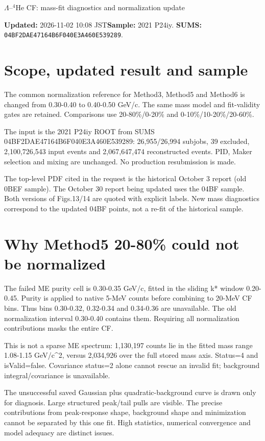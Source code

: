 \documentclass[10pt,a4paper]{article}
\begin{document}
\begin{center}{\Large $\Lambda$--$^{4}$He CF: mass-fit diagnostics and normalization update}\end{center}
\textbf{Updated:} 2026-11-02 10:08 JST\quad\textbf{Sample:} 2021 P24iy.
\textbf{SUMS:} \texttt{04BF2DAE47164B6F040E3A460E539289}.
\section*{Scope, updated result and sample}
The common normalization reference for Method3, Method5 and Method6 is changed from 0.30-0.40 to 0.40-0.50 GeV/c. The same mass model and fit-validity gates are retained. Comparisons use 20-80\%/0-20\% and 0-10\%/10-20\%/20-60\%.

The input is the 2021 P24iy ROOT from SUMS 04BF2DAE47164B6F040E3A460E539289: 26,955/26,994 subjobs, 39 excluded, 2,100,726,543 input events and 2,067,647,474 reconstructed events. PID, Maker selection and mixing are unchanged. No production resubmission is made.

The top-level PDF cited in the request is the historical October 3 report (old 0BEF sample). The October 30 report being updated uses the 04BF sample. Both versions of Figs.13/14 are quoted with explicit labels. New mass diagnostics correspond to the updated 04BF points, not a re-fit of the historical sample.

\clearpage
\section*{Why Method5 20-80\% could not be normalized}
The failed ME purity cell is 0.30-0.35 GeV/c, fitted in the sliding k* window 0.20-0.45. Purity is applied to native 5-MeV counts before combining to 20-MeV CF bins. Thus bins 0.30-0.32, 0.32-0.34 and 0.34-0.36 are unavailable. The old normalization interval 0.30-0.40 contains them. Requiring all normalization contributions masks the entire CF.

This is not a sparse ME spectrum: 1,130,197 counts lie in the fitted mass range 1.08-1.15 GeV/c\textasciicircum{}2, versus 2,034,926 over the full stored mass axis. Status=4 and isValid=false. Covariance status=2 alone cannot rescue an invalid fit; background integral/covariance is unavailable.

The unsuccessful saved Gaussian plus quadratic-background curve is drawn only for diagnosis. Large structured peak/tail pulls are visible. The precise contributions from peak-response shape, background shape and minimization cannot be separated by this one fit. High statistics, numerical convergence and model adequacy are distinct issues.
\end{document}
